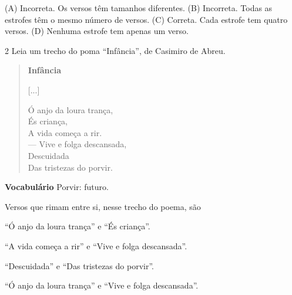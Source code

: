 
(A) Incorreta. Os versos têm tamanhos diferentes.
(B) Incorreta. Todas as estrofes têm o mesmo número de versos.
(C) Correta. Cada estrofe tem quatro versos.
(D) Nenhuma estrofe tem apenas um verso.

\num{2} Leia um trecho do poma ``Infância'', de Casimiro de Abreu.

\begin{verse}
\textbf{Infância}

{[}...{]}

Ó anjo da loura trança,\\
És criança,\\
A vida começa a rir.\\
--- Vive e folga descansada,\\
Descuidada\\
Das tristezas do porvir.
\end{verse}


\textbf{Vocabulário}
Porvir: futuro.

Versos que rimam entre si, nesse trecho do poema, são

\begin{escolha}
\item ``Ó anjo da loura trança'' e ``És criança''.

\item ``A vida começa a rir'' e ``Vive e folga descansada''.

\item ``Descuidada'' e ``Das tristezas do porvir''.

\item ``Ó anjo da loura trança'' e ``Vive e folga descansada''.
\end{escolha}


